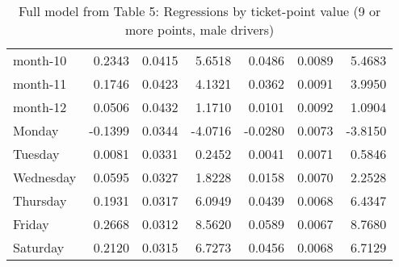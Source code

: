\documentclass[10pt]{article}
\begin{document}
\begin{table}[ht]
\begin{tabular}{lrrrrrr}
  month-10 & 0.2343 & 0.0415 & 5.6518 & 0.0486 & 0.0089 & 5.4683 \\ 
  month-11 & 0.1746 & 0.0423 & 4.1321 & 0.0362 & 0.0091 & 3.9950 \\ 
  month-12 & 0.0506 & 0.0432 & 1.1710 & 0.0101 & 0.0092 & 1.0904 \\ 
  Monday & -0.1399 & 0.0344 & -4.0716 & -0.0280 & 0.0073 & -3.8150 \\ 
  Tuesday & 0.0081 & 0.0331 & 0.2452 & 0.0041 & 0.0071 & 0.5846 \\ 
  Wednesday & 0.0595 & 0.0327 & 1.8228 & 0.0158 & 0.0070 & 2.2528 \\ 
  Thursday & 0.1931 & 0.0317 & 6.0949 & 0.0439 & 0.0068 & 6.4347 \\ 
  Friday & 0.2668 & 0.0312 & 8.5620 & 0.0589 & 0.0067 & 8.7680 \\ 
  Saturday & 0.2120 & 0.0315 & 6.7273 & 0.0456 & 0.0068 & 6.7129 \\ 
   \hline
\end{tabular}
\caption{Full model from Table 5: Regressions by ticket-point value (9 or more points, male drivers)} 
\label{tab_5_9plus_pts_no_age_M}
\end{table}


\clearpage
\pagebreak



\end{document}
